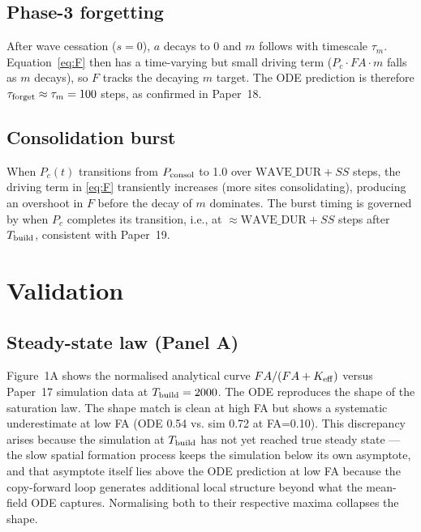 \documentclass[11pt]{article}
\begin{document}
\subsection{Phase-3 forgetting}

After wave cessation ($s=0$), $a$ decays to 0 and $m$ follows with timescale $\tau_m$.
Equation~\eqref{eq:F} then has a time-varying but small driving term ($P_c\cdot FA\cdot m$
falls as $m$ decays), so $F$ tracks the decaying $m$ target.
The ODE prediction is therefore $\tau_{\rm forget} \approx \tau_m = 100$ steps,
as confirmed in Paper~18.

\subsection{Consolidation burst}

When $P_c(t)$ transitions from $P_{\rm consol}$ to 1.0 over $\mathrm{WAVE\_DUR} + SS$ steps,
the driving term in \eqref{eq:F} transiently increases (more sites consolidating),
producing an overshoot in $F$ before the decay of $m$ dominates.
The burst timing is governed by when $P_c$ completes its transition, i.e., at
$\approx \mathrm{WAVE\_DUR} + SS$ steps after $T_{\rm build}$, consistent with Paper~19.

\section{Validation}

\subsection{Steady-state law (Panel A)}

Figure~1A shows the normalised analytical curve $FA/(FA + K_{\rm eff})$ versus
Paper~17 simulation data at $T_{\rm build} = 2000$.
The ODE reproduces the shape of the saturation law.
The shape match is clean at high FA but shows a systematic underestimate at low FA
(ODE 0.54 vs. sim 0.72 at FA=0.10).
This discrepancy arises because the simulation at $T_{\rm build}$ has not yet reached
true steady state --- the slow spatial formation process keeps the simulation below
its own asymptote, and that asymptote itself lies above the ODE prediction at low FA
because the copy-forward loop generates additional local structure beyond what
the mean-field ODE captures.
Normalising both to their respective maxima collapses the shape.
\end{document}
